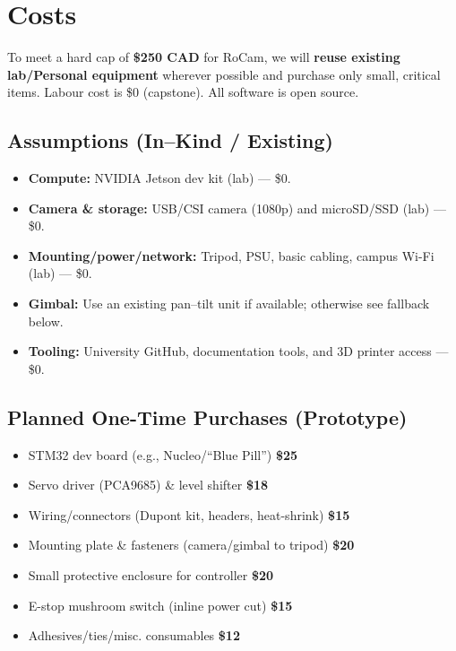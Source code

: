 \documentclass[12pt]{article}
\begin{document}
\section{Costs}
\label{sec:costs}

To meet a hard cap of \textbf{\$250 CAD} for RoCam, we will \textbf{reuse existing lab/Personal equipment} wherever possible and purchase only small, critical items. Labour cost is \$0 (capstone). All software is open source.

\subsection*{Assumptions (In–Kind / Existing)}
\begin{itemize}
  \item \textbf{Compute:} NVIDIA Jetson dev kit (lab) — \$0.
  \item \textbf{Camera \& storage:} USB/CSI camera (1080p) and microSD/SSD (lab) — \$0.
  \item \textbf{Mounting/power/network:} Tripod, PSU, basic cabling, campus Wi-Fi (lab) — \$0.
  \item \textbf{Gimbal:} Use an existing pan–tilt unit if available; otherwise see fallback below.
  \item \textbf{Tooling:} University GitHub, documentation tools, and 3D printer access — \$0.
\end{itemize}

\subsection*{Planned One-Time Purchases (Prototype)}
\begin{itemize}
  \item STM32 dev board (e.g., Nucleo/“Blue Pill”) \dotfill \textbf{\$25}
  \item Servo driver (PCA9685) \& level shifter \dotfill \textbf{\$18}
  \item Wiring/connectors (Dupont kit, headers, heat-shrink) \dotfill \textbf{\$15}
  \item Mounting plate \& fasteners (camera/gimbal to tripod) \dotfill \textbf{\$20}
  \item Small protective enclosure for controller \dotfill \textbf{\$20}
  \item E-stop mushroom switch (inline power cut) \dotfill \textbf{\$15}
  \item Adhesives/ties/misc. consumables \dotfill \textbf{\$12}
\end{itemize}
\end{document}
